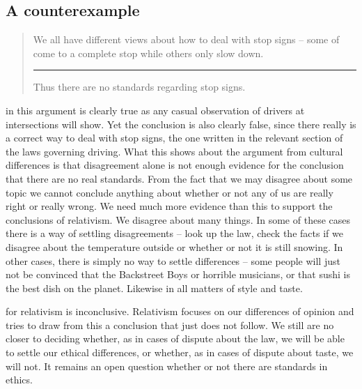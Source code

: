 \documentclass[justified]{tufte-book}
\newenvironment{argument}{\begin{quote}\normalsize}{\end{quote}}
\begin{document}
\hypertarget{a-counterexample}{%
\subsection*{A counterexample}\label{a-counterexample}}

\begin{argument}
We all have different views about how to deal with stop signs -- some of
come to a complete stop while others only slow down.\\

\begin{center}\rule{0.5\linewidth}{\linethickness}\end{center}

Thus there are no standards regarding stop signs.
\end{argument}

 in this argument is clearly true as any casual observation of drivers at intersections will show. Yet the conclusion is also clearly false, since there really is a correct way to deal with stop signs, the one written in the relevant section of the laws governing driving. What this shows about the argument from cultural differences is that disagreement alone is not enough evidence for the conclusion that there are no real standards. From the fact that we may disagree about some topic we cannot conclude anything about whether or not any of us are really right or really wrong. We need much more evidence than this to support the conclusions of relativism. We disagree about many things. In some of these cases there is a way of settling disagreements -- look up the law, check the facts if we disagree about the temperature outside or whether or not it is still snowing. In other cases, there is simply no way to settle differences -- some people will just not be convinced that the Backstreet Boys or horrible musicians, or that sushi is the best dish on the planet. Likewise in all matters of style and taste.

 for relativism is inconclusive. Relativism focuses on our differences of opinion and tries to draw from this a conclusion that just does not follow. We still are no closer to deciding whether, as in cases of dispute about the law, we will be able to settle our ethical differences, or whether, as in cases of dispute about taste, we will not. It remains an open question whether or not there are standards in ethics.
\end{document}
